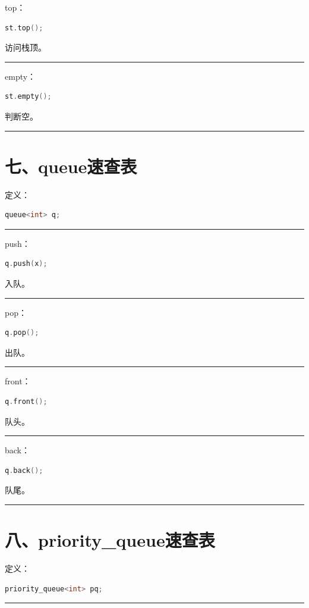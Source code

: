\documentclass[9pt,twocolumn]{extarticle}
\begin{document}
top：
\begin{lstlisting}[language=C++]
st.top();
\end{lstlisting}
访问栈顶。

\noindent\rule{\linewidth}{0.4pt}

empty：
\begin{lstlisting}[language=C++]
st.empty();
\end{lstlisting}
判断空。

\noindent\rule{\linewidth}{0.4pt}

\section{七、queue速查表}

定义：
\begin{lstlisting}[language=C++]
queue<int> q;
\end{lstlisting}

\noindent\rule{\linewidth}{0.4pt}

push：
\begin{lstlisting}[language=C++]
q.push(x);
\end{lstlisting}
入队。

\noindent\rule{\linewidth}{0.4pt}

pop：
\begin{lstlisting}[language=C++]
q.pop();
\end{lstlisting}
出队。

\noindent\rule{\linewidth}{0.4pt}

front：
\begin{lstlisting}[language=C++]
q.front();
\end{lstlisting}
队头。

\noindent\rule{\linewidth}{0.4pt}

back：
\begin{lstlisting}[language=C++]
q.back();
\end{lstlisting}
队尾。

\noindent\rule{\linewidth}{0.4pt}

\section{八、priority\_queue速查表}

定义：
\begin{lstlisting}[language=C++]
priority_queue<int> pq;
\end{lstlisting}

\noindent\rule{\linewidth}{0.4pt}
\end{document}
